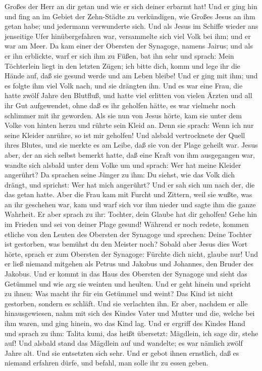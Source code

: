 Großes der Herr an dir getan und wie er sich deiner erbarmt hat!
 Und er ging hin und fing an im Gebiet der Zehn-Städte zu
verkündigen, wie Großes Jesus an ihm getan habe; und jedermann
verwunderte sich.  Und als Jesus im Schiffe wieder ans
jenseitige Ufer hinübergefahren war, versammelte sich viel Volk bei ihm;
und er war am Meer.  Da kam einer der Obersten der
Synagoge, namens Jairus; und als er ihn erblickte, warf er sich ihm zu
Füßen,  bat ihn sehr und sprach: Mein Töchterlein liegt
in den letzten Zügen; ich bitte dich, komm und lege ihr die Hände auf,
daß sie gesund werde und am Leben bleibe!  Und er ging
mit ihm; und es folgte ihm viel Volk nach, und sie drängten ihn.
 Und es war eine Frau, die hatte zwölf Jahre den
Blutfluß,  und hatte viel erlitten von vielen Ärzten und
all ihr Gut aufgewendet, ohne daß es ihr geholfen hätte, es war vielmehr
noch schlimmer mit ihr geworden.  Als sie nun von Jesus
hörte, kam sie unter dem Volke von hinten herzu und rührte sein Kleid
an.  Denn sie sprach: Wenn ich nur seine Kleider anrühre,
so ist mir geholfen!  Und alsbald vertrocknete der Quell
ihres Blutes, und sie merkte es am Leibe, daß sie von der Plage geheilt
war.  Jesus aber, der an sich selbst bemerkt hatte, daß
eine Kraft von ihm ausgegangen war, wandte sich alsbald unter dem Volke
um und sprach: Wer hat meine Kleider angerührt?  Da
sprachen seine Jünger zu ihm: Du siehst, wie das Volk dich drängt, und
sprichst: Wer hat mich angerührt?  Und er sah sich um
nach der, die das getan hatte.  Aber die Frau kam mit
Furcht und Zittern, weil sie wußte, was an ihr geschehen war, kam und
warf sich vor ihm nieder und sagte ihm die ganze Wahrheit.
 Er aber sprach zu ihr: Tochter, dein Glaube hat dir
geholfen! Gehe hin im Frieden und sei von deiner Plage gesund!
 Während er noch redete, kommen etliche von den Leuten
des Obersten der Synagoge und sprechen: Deine Tochter ist gestorben, was
bemühst du den Meister noch?  Sobald aber Jesus dies Wort
hörte, sprach er zum Obersten der Synagoge: Fürchte dich nicht, glaube
nur!  Und er ließ niemand mitgehen als Petrus und Jakobus
und Johannes, den Bruder des Jakobus.  Und er kommt in
das Haus des Obersten der Synagoge und sieht das Getümmel und wie arg
sie weinten und heulten.  Und er geht hinein und spricht
zu ihnen: Was macht ihr für ein Getümmel und weint? Das Kind ist nicht
gestorben, sondern es schläft.  Und sie verlachten ihn.
Er aber, nachdem er alle hinausgewiesen, nahm mit sich des Kindes Vater
und Mutter und die, welche bei ihm waren, und ging hinein, wo das Kind
lag.  Und er ergriff des Kindes Hand und sprach zu ihm:
Talita kumi, das heißt übersetzt: Mägdlein, ich sage dir, stehe auf!
 Und alsbald stand das Mägdlein auf und wandelte; es war
nämlich zwölf Jahre alt. Und sie entsetzten sich sehr. 
Und er gebot ihnen ernstlich, daß es niemand erfahren dürfe, und befahl,
man solle ihr zu essen geben.

